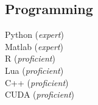 \documentclass[letterpaper]{deedy-resume} %
\begin{document}
\begin{minipage}[t]{0.33\textwidth}
\subsection{Programming}


Python ({\it expert}) \\  Matlab ({\it expert}) \\R ({\it proficient})\\  Lua ({\it proficient}) \\ C++ ({\it proficient}) \\  CUDA ({\it proficient})
\sectionspace %


\end{minipage} %
\hfill
%
%
\end{document}
